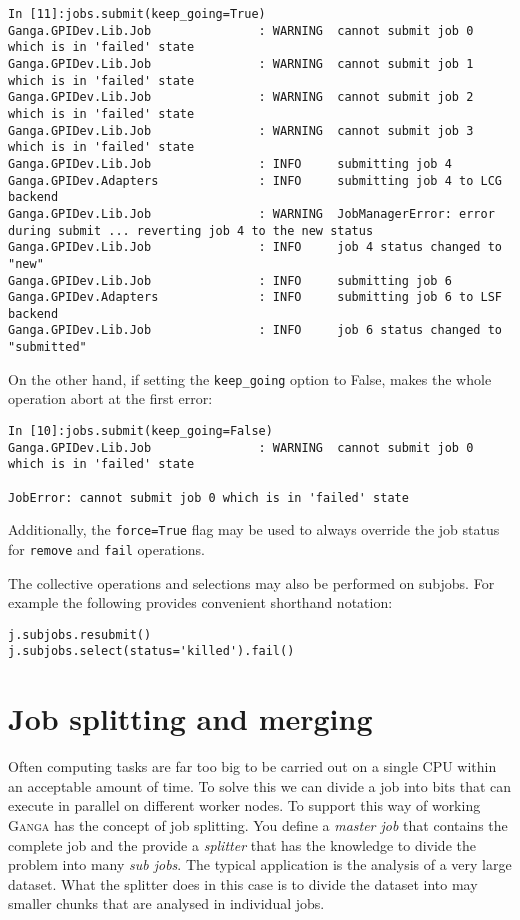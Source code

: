 \documentclass{howto}
\def\ganga {\textsc{Ganga}\xspace}
\begin{document}
\begin{verbatim}
In [11]:jobs.submit(keep_going=True)
Ganga.GPIDev.Lib.Job               : WARNING  cannot submit job 0 which is in 'failed' state
Ganga.GPIDev.Lib.Job               : WARNING  cannot submit job 1 which is in 'failed' state
Ganga.GPIDev.Lib.Job               : WARNING  cannot submit job 2 which is in 'failed' state
Ganga.GPIDev.Lib.Job               : WARNING  cannot submit job 3 which is in 'failed' state
Ganga.GPIDev.Lib.Job               : INFO     submitting job 4
Ganga.GPIDev.Adapters              : INFO     submitting job 4 to LCG backend
Ganga.GPIDev.Lib.Job               : WARNING  JobManagerError: error during submit ... reverting job 4 to the new status
Ganga.GPIDev.Lib.Job               : INFO     job 4 status changed to "new"
Ganga.GPIDev.Lib.Job               : INFO     submitting job 6
Ganga.GPIDev.Adapters              : INFO     submitting job 6 to LSF backend
Ganga.GPIDev.Lib.Job               : INFO     job 6 status changed to "submitted"
\end{verbatim}

On the other hand, if setting the \texttt{keep_going} option to False, makes the whole operation abort at the first error:

\begin{verbatim}
In [10]:jobs.submit(keep_going=False)
Ganga.GPIDev.Lib.Job               : WARNING  cannot submit job 0 which is in 'failed' state

JobError: cannot submit job 0 which is in 'failed' state
\end{verbatim}

Additionally, the \texttt{force=True} flag may be used to always override the job status for \texttt{remove} and \texttt{fail} operations.

The collective operations and selections may also be performed on subjobs. For example the following provides convenient shorthand notation:

\begin{verbatim}
j.subjobs.resubmit()
j.subjobs.select(status='killed').fail()
\end{verbatim}
 

\section{Job splitting and merging}

Often computing tasks are far too big to be carried out on a single CPU within
an acceptable amount of time. To solve this we can divide a job into bits that
can execute in parallel on different worker nodes. To support this way of
working \ganga has the concept of job splitting. You define a \emph{master
  job} that contains the complete job and the provide a \emph{splitter} that
has the knowledge to divide the problem into many \emph{sub jobs}. The typical
application is the analysis of a very large dataset. What the splitter does in
this case is to divide the dataset into may smaller chunks that are analysed
in individual jobs.
\end{document}
